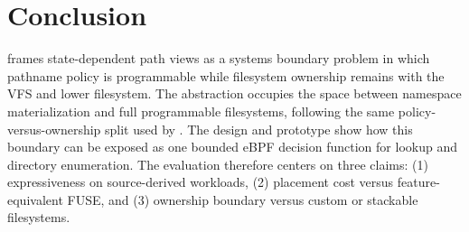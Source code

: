 \section{Conclusion}
\label{sec:conclusion}

\namei frames state-dependent path views as a systems boundary problem in which
pathname policy is programmable while filesystem ownership remains with the VFS
and lower filesystem. The abstraction occupies the space between namespace
materialization and full programmable filesystems, following the same
policy-versus-ownership split used by . The design and
prototype show how this boundary can be exposed as one bounded eBPF decision
function for lookup and directory enumeration. The evaluation therefore centers
on three claims: (1) expressiveness on source-derived workloads, (2) placement
cost versus feature-equivalent FUSE, and (3) ownership boundary versus custom or
stackable filesystems.
